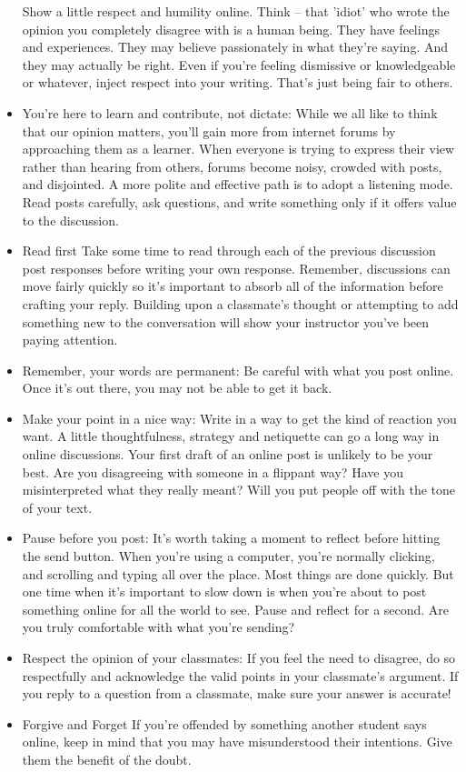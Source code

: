 \documentclass{article}
\begin{document}
\begin{itemize}
    Show a little respect and humility online. Think – that 'idiot' who wrote the opinion you completely disagree with is a human being. They have feelings and experiences. They may believe passionately in what they're saying. And they may actually be right.
    Even if you're feeling dismissive or knowledgeable or whatever, inject respect into your writing. That's just being fair to others.
    \item You're here to learn and contribute, not dictate: 
    While we all like to think that our opinion matters, you'll gain more from internet forums by approaching them as a learner.
    When everyone is trying to express their view rather than hearing from others, forums become noisy, crowded with posts, and disjointed. 
    A more polite and effective path is to adopt a listening mode. Read posts carefully, ask questions, and write something only if it offers value to the discussion.
    \item Read first
    Take some time to read through each of the previous discussion post responses before writing your own response. Remember, discussions can move fairly quickly so it’s important to absorb all of the information before crafting your reply. Building upon a classmate’s thought or attempting to add something new to the conversation will show your instructor you’ve been paying attention.
    \item Remember, your words are permanent: Be careful with what you post online. Once it's out there, you may not be able to get it back.
    \item Make your point in a nice way:
    Write in a way to get the kind of reaction you want. A little thoughtfulness, strategy and netiquette can go a long way in online discussions.
    Your first draft of an online post is unlikely to be your best. Are you disagreeing with someone in a flippant way? Have you misinterpreted what they really meant? Will you put people off with the tone of your text.
    \item Pause before you post:
    It's worth taking a moment to reflect before hitting the send button.
    When you're using a computer, you're normally clicking, and scrolling and typing all over the place. Most things are done quickly. But one time when it's important to slow down is when you're about to post something online for all the world to see. Pause and reflect for a second. Are you truly comfortable with what you're sending?
    \item Respect the opinion of your classmates: 
    If you feel the need to disagree, do so respectfully and acknowledge the valid points in your classmate's argument. If you reply to a question from a classmate, make sure your answer is accurate!
    \item Forgive and Forget
    If you’re offended by something another student says online, keep in mind that you may have misunderstood their intentions. Give them the benefit of the doubt.
 \end{itemize}
\end{document}
